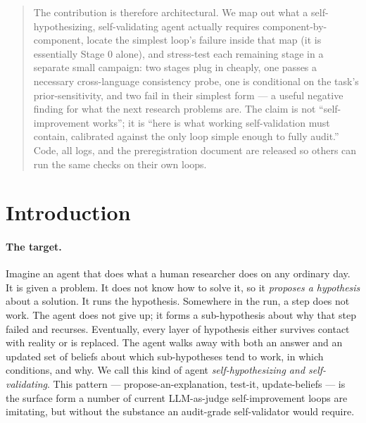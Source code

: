 \documentclass{article}
\begin{document}
\begin{CJK*}{UTF8}{gbsn}
\begin{abstract}
\noindent The contribution is therefore architectural. We map out
what a self-hypothesizing, self-validating agent actually
requires component-by-component, locate the simplest loop's
failure inside that map (it is essentially Stage 0 alone), and
stress-test each remaining stage in a separate small campaign:
two stages plug in cheaply, one passes a necessary
cross-language consistency probe, one is conditional on the
task's prior-sensitivity, and two fail in their simplest
form --- a useful negative finding for what the next research
problems are. The claim is not ``self-improvement works''; it is
``here is what working self-validation must contain, calibrated
against the only loop simple enough to fully audit.'' Code,
all logs, and the preregistration document are released so others
can run the same checks on their own loops.
\end{abstract}

\section{Introduction}
\label{sec:intro}

\paragraph{The target.}
Imagine an agent that does what a human researcher does on any
ordinary day. It is given a problem. It does not know how to solve
it, so it \emph{proposes a hypothesis} about a solution. It runs
the hypothesis. Somewhere in the run, a step does not work. The
agent does not give up; it forms a sub-hypothesis about why that
step failed and recurses. Eventually, every layer of hypothesis
either survives contact with reality or is replaced. The agent
walks away with both an answer and an updated set of beliefs about
which sub-hypotheses tend to work, in which conditions, and why.
We call this kind of agent \emph{self-hypothesizing and
self-validating}. This pattern --- propose-an-explanation,
test-it, update-beliefs --- is the surface form a number of
current LLM-as-judge self-improvement loops are imitating, but
without the substance an audit-grade self-validator would
require.


\end{CJK*}
\end{document}

